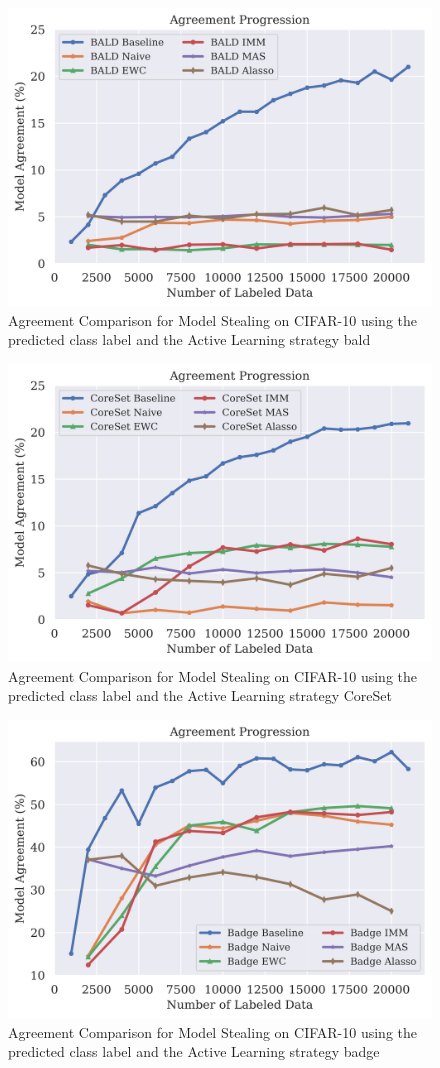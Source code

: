 \begin{figure}[!htb]
    \centering
    \includegraphics[width=0.5\linewidth]{images/results_CALMS/cifar100_label_bald.png}
    \caption{Agreement Comparison for Model Stealing on CIFAR-10 using the predicted class label and the Active Learning strategy \gls{bald}}
    \label{fig:CALMSCIFAR10LabelBALD}
\end{figure}

\begin{figure}[!htb]
    \centering
    \includegraphics[width=0.5\linewidth]{images/results_CALMS/cifar100_label_coreset.png}
    \caption{Agreement Comparison for Model Stealing on CIFAR-10 using the predicted class label and the Active Learning strategy CoreSet}
    \label{fig:CALMSCIFAR10LabelCoreSet}
\end{figure}

\begin{figure}[!htb]
    \centering
    \includegraphics[width=0.5\linewidth]{images/results_CALMS/cifar_label_badge.png}
    \caption{Agreement Comparison for Model Stealing on CIFAR-10 using the predicted class label and the Active Learning strategy \gls{badge}}
    \label{fig:CALMSCIFAR10LabelBadge}
\end{figure}

